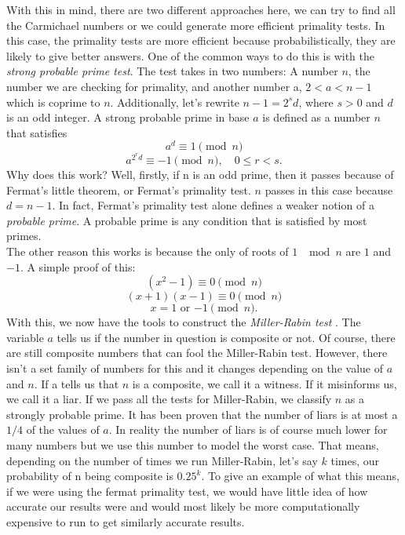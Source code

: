 \documentclass[conference]{IEEEtran}
\begin{document}
With this in mind, there are two different approaches here, we can try to find all the Carmichael numbers or we could generate more efficient primality tests. In this case, the primality tests are more efficient because probabilistically, they are likely to give better answers. One of the common ways to do this is with the \textit{strong probable prime test}. The test takes in two numbers: A number $n$, the number we are checking for primality, and another number a, $2 < a < n - 1$ which is coprime to $n$. Additionally, let's rewrite $n - 1 = 2^s d$, where $s > 0$ and $d$ is an odd integer. A strong probable prime in base $a$ is defined as a number $n$ that satisfies 
\[
  a^d \equiv 1 \pmod{n}
\]
\[
  a^{2^r d} \equiv -1 \pmod{n}, \quad 0 \leq r < s.
\]
Why does this work? Well, firstly, if n is an odd prime, then it passes because of Fermat's little theorem, or Fermat's primality test. $n$ passes in this case because $d = n - 1$. In fact, Fermat's primality test alone defines a weaker notion of a \textit{probable prime}. A probable prime is any condition that is satisfied by most primes. \\
The other reason this works is because the only of roots of $1$ $\mod n$ are $1$ and $-1$. A simple proof of this:
\[
  (x^2 - 1) \equiv 0 \pmod {n}
\]
\[
  (x + 1)(x - 1) \equiv 0 \pmod{n}
\]
\[
  x = 1 \text{ or }  {-1} \pmod{n}.
\]
With this, we now have the tools to construct the \textit{Miller-Rabin test} \cite{b6}. The variable $a$ tells us if the number in question is composite or not. Of course, there are still composite numbers that can fool the Miller-Rabin test. However, there isn't a set family of numbers for this and it changes depending on the value of $a$ and $n$. If a tells us that $n$ is a composite, we call it a witness. If it misinforms us, we call it a liar. If we pass all the tests for Miller-Rabin, we classify $n$ as a strongly probable prime. It has been proven that the number of liars is at most a \href{https://doi.org/10.1016%2F0022-314X%2880%2990084-0}{$1/4$} of the values of $a$. In reality the number of liars is of course much lower for many numbers but we use this number to model the worst case. That means, depending on the number of times we run Miller-Rabin, let's say $k$ times, our probability of n being composite is $0.25^k$. To give an example of what this means, if we were using the fermat primality test, we would have little idea of how accurate our results were and would most likely be more computationally expensive to run to get similarly accurate results.
\end{document}

